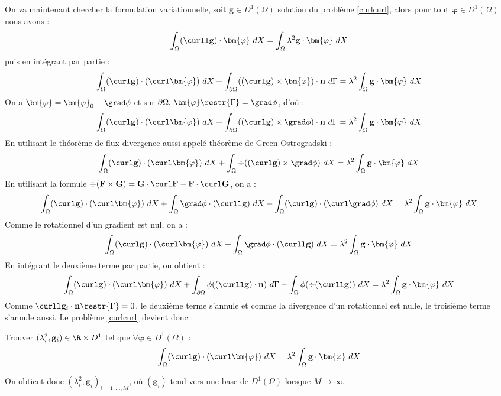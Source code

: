 On va maintenant chercher la formulation variationnelle, soit $\mathbf{g}\in D^1(\Omega)$ solution du problème \ref{curlcurl}, alors pour tout $\bm{\varphi}\in D^1(\Omega)$ nous avons :
\[ \int_\Omega (\curll \mathbf{g})\cdot\bm{\varphi}\ dX = \int_\Omega\lambda^2 \mathbf{g}\cdot\bm{\varphi}\ dX \]
puis en intégrant par partie :
\[ \int_\Omega (\curl \mathbf{g})\cdot(\curl\bm{\varphi})\ dX + \int_{\partial\Omega} ((\curl \mathbf{g})\times \bm{\varphi})\cdot \mathbf{n}\ d\Gamma = \lambda^2\int_\Omega \mathbf{g}\cdot\bm{\varphi}\ dX \]
On a $\bm{\varphi}=\bm{\varphi}_0+\grad\phi$ et sur $\partial\Omega,\, \bm{\varphi}\restr{\Gamma}=\grad\phi$, d'où :
\[ \int_\Omega (\curl \mathbf{g})\cdot(\curl\bm{\varphi})\ dX + \int_{\partial\Omega} ((\curl \mathbf{g})\times \grad\phi)\cdot \mathbf{n}\ d\Gamma = \lambda^2\int_\Omega \mathbf{g}\cdot\bm{\varphi}\ dX \]
En utilisant le théorème de flux-divergence aussi appelé théorème de Green-Ostrogradski :
\[ \int_\Omega (\curl \mathbf{g})\cdot(\curl\bm{\varphi})\ dX + \int_\Omega \div((\curl \mathbf{g})\times \grad\phi)\ dX = \lambda^2\int_\Omega \mathbf{g}\cdot\bm{\varphi}\ dX \]
En utilisant la formule $\div(\mathbf{F}\times \mathbf{G}) = \mathbf{G}\cdot \curl \mathbf{F} - \mathbf{F}\cdot \curl \mathbf{G}$, on a :
\[ \int_\Omega (\curl \mathbf{g})\cdot(\curl\bm{\varphi})\ dX + \int_\Omega \grad\phi\cdot(\curll \mathbf{g})\ dX -\int_\Omega (\curl \mathbf{g})\cdot (\curl\grad\phi)\ dX  = \lambda^2\int_\Omega \mathbf{g}\cdot\bm{\varphi}\ dX \]
Comme le rotationnel d'un gradient est nul, on a :
\[ \int_\Omega (\curl \mathbf{g})\cdot(\curl\bm{\varphi})\ dX + \int_\Omega \grad\phi\cdot(\curll \mathbf{g})\ dX  = \lambda^2\int_\Omega \mathbf{g}\cdot\bm{\varphi}\ dX \]
En intégrant le deuxième terme par partie, on obtient :
\[ \int_\Omega (\curl \mathbf{g})\cdot(\curl\bm{\varphi})\ dX + \int_{\partial\Omega} \phi((\curll \mathbf{g})\cdot \mathbf{n})\ d\Gamma - \int_\Omega \phi(\div(\curll \mathbf{g}))\ dX  = \lambda^2\int_\Omega \mathbf{g}\cdot\bm{\varphi}\ dX \]
Comme $\curll  \mathbf{g}_i\cdot \mathbf{n}\restr{\Gamma} = 0$, le deuxième terme s'annule et comme la divergence d'un rotationnel est nulle, le troisième terme s'annule aussi. Le problème \ref{curlcurl} devient donc :
\begin{pb}\label{fveigen}
Trouver $(\lambda_i^2,\mathbf{g}_i)\in \R\times D^1$ tel que $\forall \bm{\varphi}\in D^1(\Omega)$ :
\begin{equation*}
\int_\Omega (\curl \mathbf{g})\cdot(\curl\bm{\varphi})\ dX = \lambda^2\int_\Omega \mathbf{g}\cdot\bm{\varphi}\ dX
\end{equation*}
\end{pb}
On obtient donc $(\lambda_i^2,\mathbf{g}_i)_{i=1,\dots,M}$, où $(\mathbf{g}_i)$ tend vers une base de $D^1(\Omega)$ lorsque $M\rightarrow \infty$.
